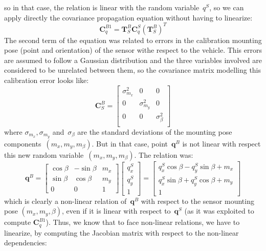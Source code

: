 so in that case, the relation is linear with the random variable~$q^S$, so we can apply directly the covariance propagation equation without having to linearize:
\begin{equation}
 \mathbf{C}^{B1}_q = \mathbf{T}^B_S \mathbf{C}^S_q (\mathbf{T}^B_S)^T
\end{equation}
The second term of the equation was related to errors in the calibration mounting pose (point and orientation) of the sensor withe respect to the vehicle. This errors are assumed to follow a Gaussian distribution and the three variables involved are considered to be unrelated between them, so the covariance matrix modelling this calibration error looks like:
\begin{equation}
 \mathbf{C}^B_S = 
 \left[
 \begin{array}{ccc}
 \sigma^2_{m_x} & 0 & 0  \\
 0 & \sigma^2_{m_y} & 0 \\
 0 & 0 & \sigma^2_{\beta} \\
 \end{array}
 \right]
\end{equation}
where $\sigma_{m_x},\sigma_{m_y}$ and~$\sigma_{\beta}$ are the standard deviations of the mounting pose components~$(m_x,m_y,m_{\beta})$. But in that case, point~$\mathbf{q}^B$ is not linear with respect this new random variable~$(m_x,m_y,m_{\beta})$. The relation was:
\begin{equation}
 \mathbf{q}^B =
 \left[
 \begin{array}{ccc}
  \cos\beta & -\sin\beta & m_x \\
  \sin\beta & \cos\beta & m_y \\
  0 & 0 & 1
 \end{array}
 \right]
 \left[
 \begin{array}{c}
  q^S_x \\
  q^S_y \\
  1
 \end{array}
 \right]
 = 
 \left[
 \begin{array}{c}
  q^S_x\cos\beta - q^S_y\sin\beta + m_x \\
  q^S_x\sin\beta + q^S_y\cos\beta + m_y \\
  1
 \end{array}
 \right]
\end{equation}
which is clearly a non-linear relation of~$\mathbf{q}^B$ with respect to the sensor mounting pose $(m_x,m_y,\beta)$, even if it is linear with respect to~$\mathbf{q}^S$ (as it was exploited to compute $\mathbf{C}^{B1}_q$). Thus, we know that to face non-linear relations, we have to linearize, by computing the Jacobian matrix with respect to the non-linear dependencies:
